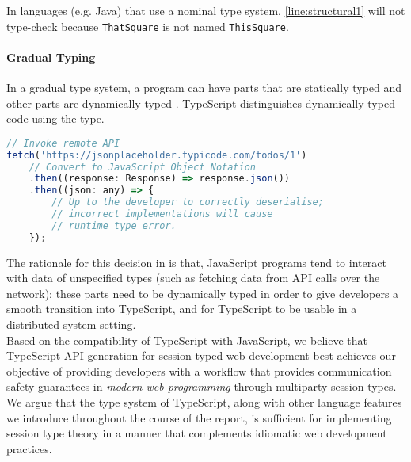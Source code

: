 In languages (e.g. Java) that use a nominal type system, 
\cref{line:structural1}
will not type-check because \texttt{ThatSquare} is not named
\texttt{ThisSquare}.

\paragraph{Gradual Typing}
In a gradual type system, a program can have parts
that are statically typed and other parts are dynamically
typed \cite{GradualTyping}.
TypeScript distinguishes dynamically typed code using
the  type.

\begin{lstlisting}[language=javascript]
// Invoke remote API
fetch('https://jsonplaceholder.typicode.com/todos/1')
	// Convert to JavaScript Object Notation
	.then((response: Response) => response.json())
	.then((json: any) => {
		// Up to the developer to correctly deserialise;
		// incorrect implementations will cause
		// runtime type error.
	});
\end{lstlisting}

The rationale for this decision in \cite{UnderstandingTypeScript}
is that, JavaScript programs tend to interact with
data of unspecified types (such as fetching data
from API calls over the network); these parts
need to be dynamically typed in order to give developers
a smooth transition into TypeScript, and for TypeScript
to be usable in a distributed system setting. \\

\noindent
Based on the compatibility of TypeScript
with JavaScript, 
we believe that TypeScript API generation for session-typed
web development best achieves our objective
of providing
developers with a workflow
that provides communication safety guarantees in \textit{modern
web programming}
through multiparty session types.
We argue that the type system of TypeScript,
along with other language features we introduce
throughout the course of the report, is sufficient
for implementing session type theory in a manner that
complements idiomatic web development practices.